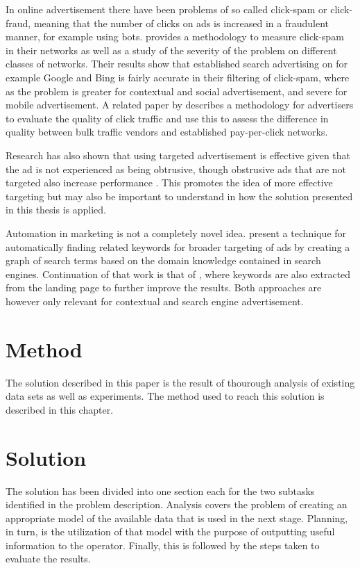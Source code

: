 \documentclass[11pt,a4paper]{report}
\begin{document}
In online advertisement there have been problems of so called click-spam or click-fraud, meaning that the number of clicks on ads is increased in a fraudulent manner, for example using bots. \citet{Dave2012} provides a methodology to measure click-spam in their networks as well as a study of the severity of the problem on different classes of networks. Their results show that established search advertising on for example Google and Bing is fairly accurate in their filtering of click-spam, where as the problem is  greater for contextual and social advertisement, and severe for mobile advertisement. A related paper by \citet{Zhang2011} describes a methodology for advertisers to evaluate the quality of click traffic and use this to assess the difference in quality between bulk traffic vendors and established pay-per-click networks.

Research has also shown that using targeted advertisement is effective given that the ad is not experienced as being obtrusive, though obstrusive ads that are not targeted also increase performance \citep{Goldfarb2011}. This promotes the idea of more effective targeting but may also be important to understand in how the solution presented in this thesis is applied.

Automation in marketing is not a completely novel idea. \citet{Joshi2006} present a technique for automatically finding related keywords for broader targeting of ads by creating a graph of search terms based on the domain knowledge contained in search engines. Continuation of that work is that of \citet{Thomaidou2011}, where keywords are also extracted from the landing page to further improve the results. Both approaches are however only relevant for contextual and search engine advertisement.

\chapter{Method}
The solution described in this paper is the result of thourough analysis of existing data sets as well as experiments. The method used to reach this solution is described in this chapter.

\chapter{Solution}
The solution has been divided into one section each for the two subtasks identified in the problem description. Analysis covers the problem of creating an appropriate model of the available data that is used in the next stage. Planning, in turn, is the utilization of that model with the purpose of outputting useful information to the operator. Finally, this is followed by the steps taken to evaluate the results.
\end{document}
